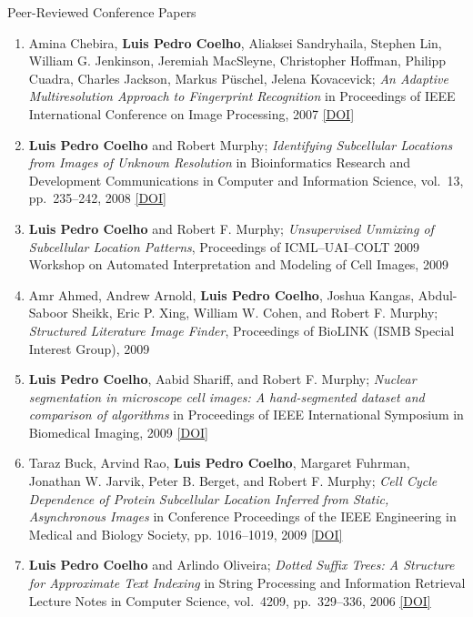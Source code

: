 \documentclass{article}
\renewcommand\subsection[1]{%
    \par\vspace{.1em}%
    {\hspace{1em}\subsubhead #1}%
    \par\vspace{.2em}%
}
\newcommand\showdoi[1]{%
    \href{http://dx.doi.org/#1}{[DOI]}%
}
\begin{document}
\subsection{Peer-Reviewed Conference Papers}
\begin{enumerate}
\item Amina Chebira, \textbf{Luis Pedro Coelho}, Aliaksei Sandryhaila, Stephen
Lin, William G. Jenkinson, Jeremiah MacSleyne, Christopher Hoffman, Philipp
Cuadra, Charles Jackson, Markus Püschel, Jelena Kovacevick; \emph{An Adaptive
Multiresolution Approach to Fingerprint Recognition} in Proceedings of IEEE
International Conference on Image Processing, 2007
\showdoi{10.1109/ICIP.2007.4378990}

\item \textbf{Luis Pedro Coelho} and Robert Murphy; \emph{Identifying
Subcellular Locations from Images of Unknown Resolution} in Bioinformatics
Research and Development Communications in Computer and Information Science,
vol.\ 13, pp.\ 235--242, 2008 \showdoi{10.1007/978-3-540-70600-7_18}

\item \textbf{Luis Pedro Coelho} and Robert F. Murphy; \emph{Unsupervised
Unmixing of Subcellular Location Patterns}, Proceedings of ICML--UAI--COLT 2009
Workshop on Automated Interpretation and Modeling of Cell Images, 2009

\item Amr Ahmed, Andrew Arnold, \textbf{Luis Pedro Coelho}, Joshua Kangas,
Abdul-Saboor Sheikk, Eric P. Xing, William W. Cohen, and Robert F. Murphy;
\emph{Structured Literature Image Finder}, Proceedings of BioLINK (ISMB Special
Interest Group), 2009

\item \textbf{Luis Pedro Coelho}, Aabid Shariff, and Robert F. Murphy;
\emph{Nuclear segmentation in microscope cell images: A hand-segmented dataset
and comparison of algorithms} in Proceedings of IEEE International Symposium in
Biomedical Imaging, 2009 \showdoi{10.1109/ISBI.2009.5193098}

\item Taraz Buck, Arvind Rao, \textbf{Luis Pedro Coelho}, Margaret Fuhrman,
Jonathan W. Jarvik, Peter B. Berget, and Robert F. Murphy; \emph{Cell Cycle
Dependence of Protein Subcellular Location Inferred from Static, Asynchronous
Images} in Conference Proceedings of the IEEE Engineering in Medical and
Biology Society, pp. 1016--1019, 2009 \showdoi{10.1109/IEMBS.2009.5332888}

\item \textbf{Luis Pedro Coelho} and Arlindo Oliveira; \emph{Dotted Suffix
Trees: A Structure for Approximate Text Indexing} in String Processing and
Information Retrieval Lecture Notes in Computer Science, vol.\ 4209, pp.\
329--336, 2006 \showdoi{10.1007/11880561_27}
\end{enumerate}
\end{document}
